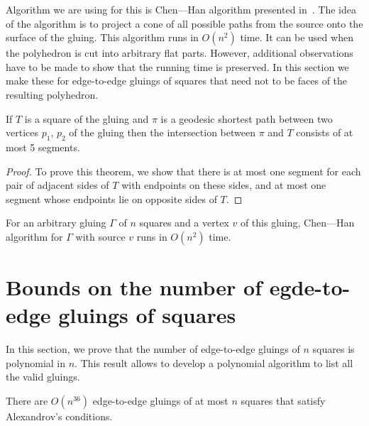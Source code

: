 \documentclass[a4paper,USenglish,cleveref, autoref, thm-restate]{socg-lipics-v2019}
\begin{document}
Algorithm we are using for this is  Chen—Han algorithm presented in~\cite{chen-han}. The idea of the algorithm is to project a cone of all possible paths from the source onto the surface of the gluing. This algorithm runs in $O(n^2)$ time. It can be used when the polyhedron is cut into arbitrary flat parts. However, additional observations have to be made to show that the running time is preserved. In this section we make these for edge-to-edge gluings of squares that need not to be faces of the resulting polyhedron.

\begin{theorem} \label{thm:shortestSquare}
	If $T$ is a square of the gluing and $\pi$ is a geodesic shortest path between two vertices $p_1$, $p_2$ of the gluing then the intersection between $\pi$ and $T$ consists of at most 5 segments.
\end{theorem}

\begin{proof}
	To prove this theorem, we show that there is at most one segment for each pair of adjacent sides of $T$ with endpoints on these sides, and at most one segment whose endpoints lie on opposite sides of $T$.
\end{proof}

\begin{corollary} \label{cor:chruntime}
	For an arbitrary gluing $\Gamma$ of $n$ squares and a vertex $v$ of this gluing, Chen—Han algorithm for $\Gamma$ with source $v$ runs in $O(n^2)$ time.
\end{corollary}

\section{Bounds on the number of egde-to-edge gluings of squares}

In this section, we prove that the number of edge-to-edge gluings of $n$ squares is polynomial in $n$. This result allows to develop a polynomial algorithm to list all the valid gluings.

\begin{theorem} \label{thm:n36}
	There are $O \left( n^{36} \right)$ edge-to-edge gluings of at most $n$ squares that satisfy Alexandrov's conditions.
\end{theorem}
\end{document}
